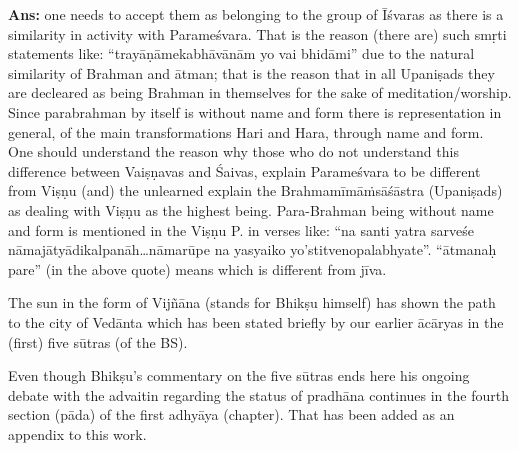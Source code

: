 \textbf{Ans:} one needs to accept them as belonging to the group of Īśvaras as there is a similarity in activity with Parameśvara. That is the reason (there are) such smṛti statements like: “trayāṇāmekabhāvānām yo vai bhidāmi” due to the natural similarity of Brahman and ātman; that is the reason that in all Upaniṣads they are decleared as being Brahman in themselves for the sake of meditation/worship. Since parabrahman by itself is without name and form there is representation in general, of the main transformations Hari and Hara, through name and form. One should understand the reason why those who do  not understand this difference between Vaiṣṇavas and Śaivas, explain Parameśvara to be different from Viṣṇu (and) the unlearned explain the Brahmamīmāṁsāśāstra (Upaniṣads) as dealing with Viṣṇu as the highest being. Para-Brahman being without name and form is mentioned in the Viṣṇu P. in verses like: “na santi yatra sarveśe nāmajātyādikalpanāh…nāmarūpe na yasyaiko yo’stitvenopalabhyate”. “ātmanaḥ pare” (in the above quote) means which is different from jīva.

The sun in the form of Vijñāna (stands for Bhikṣu himself) has shown the path to the city of Vedānta which has been stated briefly by our earlier ācāryas in the (first) five sūtras (of the BS).

Even though Bhikṣu’s commentary on the five sūtras ends here his ongoing debate with the advaitin regarding the status of pradhāna continues in the fourth section (pāda) of the first adhyāya (chapter).  That has been added as an appendix to this work.
